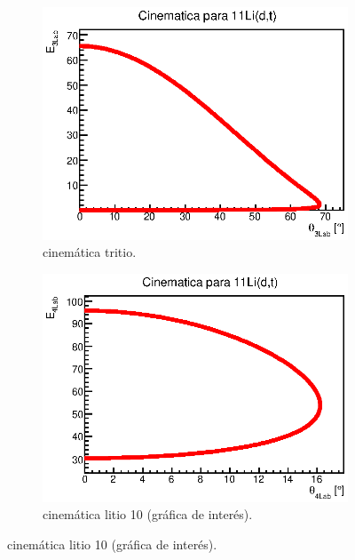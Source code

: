 \documentclass[12pt,a4paper]{article}
\numberwithin{equation}{section}
\numberwithin{figure}{section}
\begin{document}
\begin{figure}[h!] \centering
    \begin{subfigure}[b]{0.45\linewidth} \centering
        \includegraphics[scale=0.8]{CinematicaH.eps}
        \caption{cinemática tritio.}
        \label{Fig:2.2.01-hidrogeno}
    \end{subfigure}
    \begin{subfigure}[b]{0.45\linewidth} \centering
        \includegraphics[scale=0.8]{Cinematica11Li.eps}
        \caption{cinemática litio 10 (gráfica de interés).}
        \label{Fig:2.2.01-litio}
    \end{subfigure}
\end{figure}
    
\end{document}
